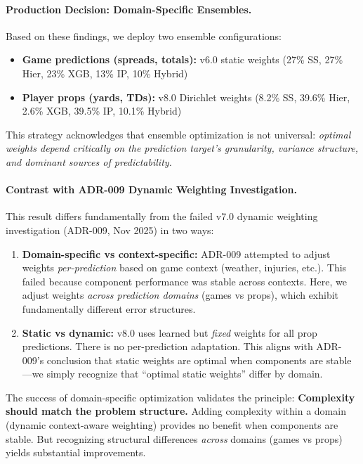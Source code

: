 \paragraph{Production Decision: Domain-Specific Ensembles.}
Based on these findings, we deploy two ensemble configurations:

\begin{itemize}[itemsep=2pt,parsep=0pt]
    \item \textbf{Game predictions (spreads, totals):} v6.0 static weights (27\% SS, 27\% Hier, 23\% XGB, 13\% IP, 10\% Hybrid)
    \item \textbf{Player props (yards, TDs):} v8.0 Dirichlet weights (8.2\% SS, 39.6\% Hier, 2.6\% XGB, 39.5\% IP, 10.1\% Hybrid)
\end{itemize}

This strategy acknowledges that ensemble optimization is not universal: \textit{optimal weights depend critically on the prediction target's granularity, variance structure, and dominant sources of predictability.}

\paragraph{Contrast with ADR-009 Dynamic Weighting Investigation.}
This result differs fundamentally from the failed v7.0 dynamic weighting investigation (ADR-009, Nov 2025) in two ways:

\begin{enumerate}[itemsep=2pt,parsep=0pt]
    \item \textbf{Domain-specific vs context-specific:} ADR-009 attempted to adjust weights \textit{per-prediction} based on game context (weather, injuries, etc.). This failed because component performance was stable across contexts. Here, we adjust weights \textit{across prediction domains} (games vs props), which exhibit fundamentally different error structures.

    \item \textbf{Static vs dynamic:} v8.0 uses learned but \textit{fixed} weights for all prop predictions. There is no per-prediction adaptation. This aligns with ADR-009's conclusion that static weights are optimal when components are stable—we simply recognize that ``optimal static weights'' differ by domain.
\end{enumerate}

The success of domain-specific optimization validates the principle: \textbf{Complexity should match the problem structure.} Adding complexity within a domain (dynamic context-aware weighting) provides no benefit when components are stable. But recognizing structural differences \textit{across} domains (games vs props) yields substantial improvements.

